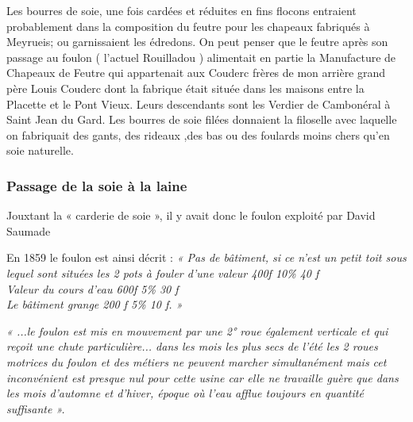 \vspace{0.35cm}

Les bourres de soie, une fois cardées et réduites en fins flocons entraient probablement
dans la composition du feutre pour les chapeaux fabriqués à Meyrueis; ou garnissaient
les édredons. On peut penser que le feutre après son passage au foulon ( l’actuel
Rouilladou ) alimentait en partie la Manufacture de Chapeaux de Feutre qui appartenait
aux Couderc frères de mon arrière grand père Louis Couderc dont la fabrique était
située dans les maisons entre la Placette et le Pont Vieux. Leurs descendants sont les
Verdier de Cambonéral à Saint Jean du Gard. Les bourres de soie filées donnaient la
filoselle avec laquelle on fabriquait des gants, des rideaux ,des bas ou des foulards moins
chers qu’en soie naturelle.

\subsubsection{Passage de la soie à la laine}

\vspace{0.55cm}

Jouxtant la « carderie de soie », il y avait donc le foulon exploité par David Saumade

\vspace{0.25cm}

En 1859 le foulon est ainsi décrit : \textit{« Pas de bâtiment, si ce n’est un petit toit sous
lequel sont situées les 2 pots à fouler d’une valeur 400f \hspace{0.5cm} 10\% \hspace{0.5cm} 40 f\\
Valeur du cours d’eau \hspace{2.1cm} 600f \hspace{0.5cm} 5\% \hspace{0.5cm} 30 f\\
Le bâtiment grange \hspace{2.4cm} 200 f \hspace{0.5cm} 5\% \hspace{0.5cm} 10 f. »}

\vspace{0.3cm}

\textit{« ...le foulon est mis en mouvement par une 2° roue également verticale et qui
reçoit une chute particulière... dans les mois les plus secs de l’été les 2 roues
motrices du foulon et des métiers ne peuvent marcher simultanément mais cet
inconvénient est presque nul pour cette usine car elle ne travaille guère que dans
les mois d’automne et d’hiver, époque où l’eau afflue toujours en quantité
suffisante ».}

